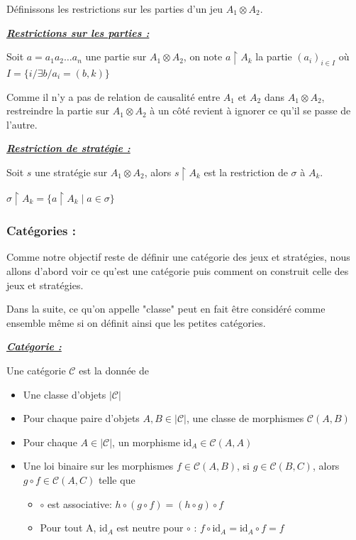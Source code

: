 \documentclass[a4paper,12pt]{article}
\renewenvironment{leftbar}{
  \def\FrameCommand{\vrule width 1pt \hspace{10pt}}
  \MakeFramed {\advance\hsize-\width \FrameRestore}
\setlength{\parskip}{10pt}}
 {\endMakeFramed}
\newenvironment{answer}[1]
{
  \vspace{0.5cm} \noindent \begin{minipage}{\linewidth}
    \textbf{\textit{\uline{#1}}}
    \begin{leftbar}
}
{
    \end{leftbar}\end{minipage}\vspace{0.2cm}
}
\begin{document}
Définissons les restrictions sur les parties d'un jeu $A_1 \otimes A_2$.

\begin{answer}{Restrictions sur les parties :}
Soit $a = a_1 a_2 \dots a_n$ une partie sur $A_1 \otimes A_2$,
on note $a \upharpoonright A_k$ la partie $(a_i)_{i \in I}$ où
$I = \{i / \exists b / a_i = (b,k)\}$
\end{answer}

Comme il n'y a pas de relation de causalité entre $A_1$ et $A_2$ dans
$A_1 \otimes A_2$, restreindre la partie sur $A_1 \otimes A_2$ à un côté
revient à ignorer ce qu'il se passe de l'autre.

\begin{answer}{Restriction de stratégie :}
Soit $s$ une stratégie sur $A_1 \otimes A_2$, alors $s\upharpoonright A_k$ est la
restriction de $\sigma$ à $A_k$.

$\sigma \upharpoonright A_k = \{a\upharpoonright A_k \mid a \in \sigma\}$

\end{answer}

\subsubsection{Catégories :}

Comme notre objectif reste de définir une catégorie des jeux et stratégies, nous
allons d'abord voir ce qu'est une catégorie puis comment on construit celle des
jeux et stratégies.

Dans la suite, ce qu'on appelle "classe" peut en fait être considéré comme
ensemble même si on définit ainsi que les petites catégories.

\begin{answer}{Catégorie :}
Une catégorie $\mathcal{C}$ est la donnée de
\begin{itemize}
\item Une classe d'objets $|\mathcal{C}|$

\item Pour chaque paire d'objets $A, B \in |\mathcal{C}|$, une classe de
morphismes $\mathcal{C}(A,B)$

\item Pour chaque $A \in |\mathcal{C}|$, un morphisme
$\text{id}_A \in \mathcal{C}(A,A)$

\item Une loi binaire sur les morphismes
$f \in \mathcal{C}(A,B)$, si $g \in \mathcal{C}(B,C)$, alors
$g \circ f \in \mathcal{C}(A,C)$
telle que
\begin{itemize}
\item $\circ$ est associative:
$h \circ (g \circ f) = (h \circ g) \circ f$

\item Pour tout A, $\text{id}_A$ est neutre pour $\circ$ :
$f \circ \text{id}_A = \text{id}_A \circ f = f$
\end{itemize}
\end{itemize}

\end{answer}
\end{document}
